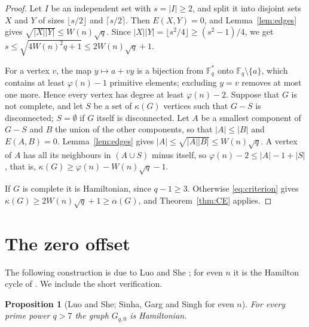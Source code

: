 \documentclass{amsart}
\newtheorem{proposition}[theorem]{Proposition}
\theoremstyle{remark}
\numberwithin{equation}{section}
\numberwithin{table}{section}
\newcommand{\F}{\mathbb{F}}
\newcommand{\abs}[1]{\lvert #1\rvert}
\begin{document}
\begin{proof}
Let $I$ be an independent set with $s=\abs I\ge2$, and split it into disjoint sets $X$ and $Y$ of sizes $\lfloor s/2\rfloor$ and $\lceil s/2\rceil$. Then $E(X,Y)=0$, and Lemma~\ref{lem:edges} gives $\sqrt{\abs X\abs Y}\le W(n)\sqrt q$. Since $\abs X\abs Y=\lfloor s^2/4\rfloor\ge(s^2-1)/4$, we get $s\le\sqrt{4W(n)^2q+1}\le 2W(n)\sqrt q+1$.

For a vertex $v$, the map $y\mapsto a+vy$ is a bijection from $\F_q^{*}$ onto $\F_q\setminus\{a\}$, which contains at least $\varphi(n)-1$ primitive elements; excluding $y=v$ removes at most one more. Hence every vertex has degree at least $\varphi(n)-2$. Suppose that $G$ is not complete, and let $S$ be a set of $\kappa(G)$ vertices such that $G-S$ is disconnected; $S=\emptyset$ if $G$ itself is disconnected. Let $A$ be a smallest component of $G-S$ and $B$ the union of the other components, so that $\abs A\le\abs B$ and $E(A,B)=0$. Lemma~\ref{lem:edges} gives $\abs A\le\sqrt{\abs A\abs B}\le W(n)\sqrt q$. A vertex of $A$ has all its neighbours in $(A\cup S)$ minus itself, so $\varphi(n)-2\le\abs A-1+\abs S$, that is, $\kappa(G)\ge\varphi(n)-W(n)\sqrt q-1$.

If $G$ is complete it is Hamiltonian, since $q-1\ge3$. Otherwise \eqref{eq:criterion} gives $\kappa(G)\ge 2W(n)\sqrt q+1\ge\alpha(G)$, and Theorem~\ref{thm:CE} applies.
\end{proof}

\section{The zero offset}\label{sec:zero}

The following construction is due to Luo and She \cite[Section~4]{LS}; for even $n$ it is the Hamilton cycle of \cite[Theorem~11(i)]{SGS}. We include the short verification.

\begin{proposition}[Luo and She; Sinha, Garg and Singh for even $n$]\label{prop:zero}
For every prime power $q>7$ the graph $G_{q,0}$ is Hamiltonian.
\end{proposition}
\end{document}
